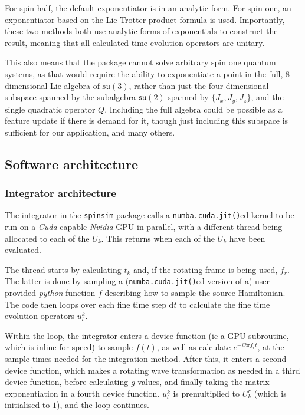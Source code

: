 \documentclass{jors}
\begin{document}
			For spin half, the default exponentiator is in an analytic form. For spin one, an exponentiator based on the Lie Trotter product formula \cite{moler_nineteen_2003} is used. Importantly, these two methods both use analytic forms of exponentials to construct the result, meaning that all calculated time evolution operators are unitary.

			This also means that the package cannot solve arbitrary spin one quantum systems, as that would require the ability to exponentiate a point in the full, 8 dimensional Lie algebra of \(\mathfrak{su}(3)\), rather than just the four dimensional subspace spanned by the subalgebra \(\mathfrak{su}(2)\) spanned by \(\{J_x, J_y, J_z\}\), and the single quadratic operator \(Q\). Including the full algebra could be possible as a feature update if there is demand for it, though just including this subspace is sufficient for our application, and many others.

	\subsection*{Software architecture}
		\subsubsection*{Integrator architecture}
			The integrator in the \texttt{spinsim} package calls a \texttt{numba.cuda.jit()}ed kernel to be run on a \emph{Cuda} capable \emph{Nvidia} GPU in parallel, with a different thread being allocated to each of the \(U_k\). This returns when each of the \(U_k\) have been evaluated.
			
			The thread starts by calculating \(t_k\) and, if the rotating frame is being used, \(f_r\). The latter is done by sampling a (\texttt{numba.cuda.jit()}ed version of a) user provided \emph{python} function \(f\) describing how to sample the source Hamiltonian. The code then loops over each fine time step \(\mathrm{d}t\) to calculate the fine time evolution operators \(u^k_l\).
			
			Within the loop, the integrator enters a device function (ie a GPU subroutine, which is inline for speed) to sample \(f(t)\), as well as calculate \(e^{-i 2 \pi f_r t}\), at the sample times needed for the integration method. After this, it enters a second device function, which makes a rotating wave transformation as needed in a third device function, before calculating \(g\) values, and finally taking the matrix exponentiation in a fourth device function. \(u^k_l\) is premultiplied to \(U^r_k\) (which is initialised to \(1\)), and the loop continues.
			
\end{document}
